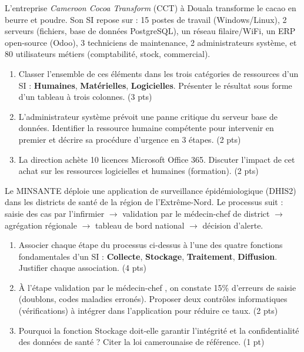 \documentclass[11pt]{article}
\begin{document}
\begin{exercice}
L'entreprise \textit{Cameroon Cocoa Transform} (CCT) à Douala transforme le cacao en beurre et poudre. Son SI repose sur : 15 postes de travail (Windows/Linux), 2 serveurs (fichiers, base de données PostgreSQL), un réseau filaire/WiFi, un ERP open-source (Odoo), 3 techniciens de maintenance, 2 administrateurs système, et 80 utilisateurs métiers (comptabilité, stock, commercial).
\begin{enumerate}
    \item Classer l'ensemble de ces éléments dans les trois catégories de ressources d'un SI : \textbf{Humaines}, \textbf{Matérielles}, \textbf{Logicielles}. Présenter le résultat sous forme d'un tableau à trois colonnes. (3 pts)
    \item L'administrateur système prévoit une panne critique du serveur base de données. Identifier la ressource humaine compétente pour intervenir en premier et décrire sa procédure d'urgence en 3 étapes. (2 pts)
    \item La direction achète 10 licences Microsoft Office 365. Discuter l'impact de cet achat sur les ressources logicielles et humaines (formation). (2 pts)
\end{enumerate}
\end{exercice}

\begin{exercice}
Le MINSANTE déploie une application de surveillance épidémiologique (DHIS2) dans les districts de santé de la région de l'Extrême-Nord. Le processus suit : saisie des cas par l'infirmier $\to$ validation par le médecin-chef de district $\to$ agrégation régionale $\to$ tableau de bord national $\to$ décision d'alerte.
\begin{enumerate}
    \item Associer chaque étape du processus ci-dessus à l'une des quatre fonctions fondamentales d'un SI : \textbf{Collecte}, \textbf{Stockage}, \textbf{Traitement}, \textbf{Diffusion}. Justifier chaque association. (4 pts)
    \item À l'étape \og validation par le médecin-chef \fg, on constate 15\% d'erreurs de saisie (doublons, codes maladies erronés). Proposer deux contrôles informatiques (vérifications) à intégrer dans l'application pour réduire ce taux. (2 pts)
    \item Pourquoi la fonction \og Stockage \fg doit-elle garantir l'intégrité et la confidentialité des données de santé ? Citer la loi camerounaise de référence. (1 pt)
\end{enumerate}
\end{exercice}
\end{document}

